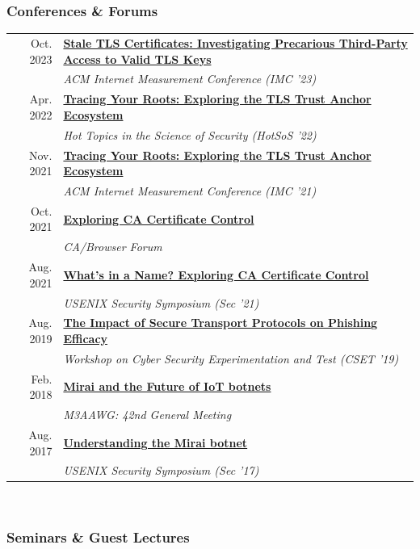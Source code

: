 \documentclass[10pt,singlecolumn]{article} %
\begin{document}
\subsubsection*{Conferences \& Forums}

\begin{tabular}{rl}
Oct. 2023 & \textbf{\href{https://zanema.com/slides/imc23_stale_certs.pdf}{Stale TLS Certificates: Investigating Precarious Third-Party Access to Valid TLS Keys}}\\
& \emph{ACM Internet Measurement Conference (IMC '23)} \\
Apr. 2022 & \textbf{\href{https://cps-vo.org/node/82522}{Tracing Your Roots: Exploring the TLS Trust Anchor Ecosystem}}\\
& \emph{Hot Topics in the Science of Security (HotSoS '22)}\\
Nov. 2021 & \textbf{\href{https://zanema.com/videos/imc21-roots.mp4}{Tracing Your Roots: Exploring the TLS Trust Anchor Ecosystem}}\\
& \emph{ACM Internet Measurement Conference (IMC '21)} \\
Oct. 2021 & \textbf{\href{https://zanema.com/slides/cab_forum_ca_transparency.pdf}{Exploring CA Certificate Control}}\\
& \emph{CA/Browser Forum} \\
Aug. 2021 & \textbf{\href{https://www.youtube.com/watch?v=Aq1o8prmoyE}{What's in a Name? Exploring CA Certificate Control}} \\
& \emph{USENIX Security Symposium (Sec '21)} \\
Aug. 2019 & \textbf{\href{https://zanema.com/slides/cset-https-phishing-2019.pdf}{The Impact of Secure Transport Protocols on Phishing Efficacy}} \\
& \emph{Workshop on Cyber Security Experimentation and Test (CSET '19)} \\
Feb. 2018 & \textbf{\href{https://zanema.com/slides/m3aawg_mirai.pdf}{Mirai and the Future of IoT botnets}}\\
& \emph{M3AAWG: 42nd General Meeting} \\ 
Aug. 2017 & \textbf{\href{https://www.youtube.com/watch?v=1pywzRTJDaY}{Understanding the Mirai botnet}} \\
& \emph{USENIX Security Symposium (Sec '17)} \\ 
\end{tabular} \\


\subsubsection*{Seminars \& Guest Lectures}
\end{document}
